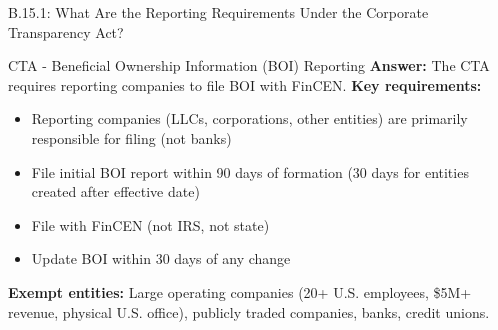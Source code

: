 \documentclass{beamer}
\begin{document}
	
	\begin{frame}{B.15.1: What Are the Reporting Requirements Under the Corporate Transparency Act?}
		\begin{block}{CTA - Beneficial Ownership Information (BOI) Reporting}
			\textbf{Answer:} The CTA requires reporting companies to file BOI with FinCEN.
			\vspace{0.2cm}
			\textbf{Key requirements:}
			\begin{itemize}
				\item Reporting companies (LLCs, corporations, other entities) are primarily responsible for filing (not banks)
				\item File initial BOI report within 90 days of formation (30 days for entities created after effective date)
				\item File with FinCEN (not IRS, not state)
				\item Update BOI within 30 days of any change
			\end{itemize}
			\textbf{Exempt entities:} Large operating companies (20+ U.S. employees, \$5M+ revenue, physical U.S. office), publicly traded companies, banks, credit unions.
		\end{block}
	\end{frame}
	
	
\end{document}

